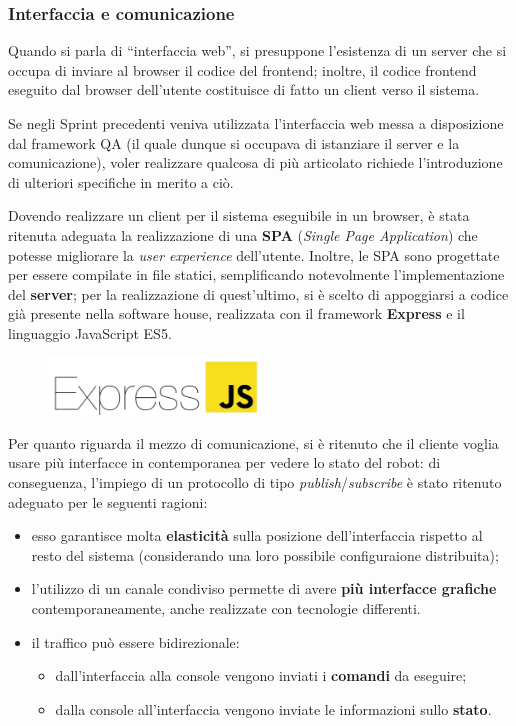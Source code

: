 \subsubsection{Interfaccia e comunicazione}

Quando si parla di ``interfaccia web'', si presuppone l'esistenza di un server che si occupa di inviare al browser il codice del frontend;
inoltre, il codice frontend eseguito dal browser dell'utente costituisce di fatto un client verso il sistema.

Se negli Sprint precedenti veniva utilizzata l'interfaccia web messa a disposizione dal framework QA (il quale dunque si occupava di istanziare il server e la comunicazione), voler realizzare qualcosa di più articolato richiede l'introduzione di ulteriori specifiche in merito a ciò.

Dovendo realizzare un client per il sistema eseguibile in un browser, è stata ritenuta adeguata la realizzazione di una \textbf{SPA} (\textit{Single Page Application}) che potesse migliorare la \textit{user experience} dell'utente.
Inoltre, le SPA sono progettate per essere compilate in file statici, semplificando notevolmente l'implementazione del \textbf{server};
per la realizzazione di quest'ultimo, si è scelto di appoggiarsi a codice già presente nella software house, realizzata con il framework \textbf{Express} e il linguaggio JavaScript ES5.

\begin{figure}[H]
  \centering
  \includegraphics[width=0.5\textwidth]{res/express.png}%
  \label{fig:sp3:express}
\end{figure}

Per quanto riguarda il mezzo di comunicazione, si è ritenuto che il cliente voglia usare più interfacce in contemporanea per vedere lo stato del robot:
di conseguenza, l'impiego di un protocollo di tipo \textit{publish}/\textit{subscribe} è stato ritenuto adeguato per le seguenti ragioni:

\begin{itemize}
  \item
    esso garantisce molta \textbf{elasticità} sulla posizione dell'interfaccia rispetto al resto del sistema (considerando una loro possibile configuraione distribuita);
  \item
    l'utilizzo di un canale condiviso permette di avere \textbf{più interfacce grafiche} contemporaneamente, anche realizzate con tecnologie differenti.
  \item
    il traffico può essere bidirezionale:
    \begin{itemize}
        \item
          dall'interfaccia alla console vengono inviati i \textbf{comandi} da eseguire;
        \item
          dalla console all'interfaccia vengono inviate le informazioni sullo \textbf{stato}.
    \end{itemize}
\end{itemize}

